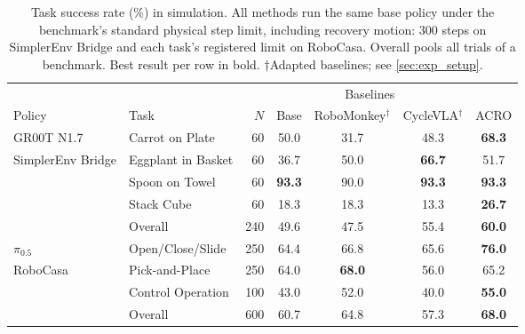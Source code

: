 \begin{table}[!t]
\centering
\small
\setlength{\tabcolsep}{6pt}
\caption{Task success rate (\%) in simulation. All methods run the same base policy under the benchmark's standard physical step limit, including recovery motion: 300 steps on SimplerEnv Bridge and each task's registered limit on RoboCasa. Overall pools all trials of a benchmark. Best result per row in bold. $\dagger$Adapted baselines; see \cref{sec:exp_setup}.}
\label{tab:main-results}
\begin{tabular}{@{}llrcccc@{}}
\toprule
 & & & \multicolumn{3}{c}{Baselines} & \\
\cmidrule(lr){4-6}
Policy & Task & $N$ & Base & RoboMonkey$^\dagger$ & CycleVLA$^\dagger$ & ACRO \\
\midrule
GR00T N1.7 & Carrot on Plate    & 60 & 50.0 & 31.7 & 48.3 & \textbf{68.3} \\
{\footnotesize SimplerEnv Bridge} & Eggplant in Basket & 60 & 36.7 & 50.0 & \textbf{66.7} & 51.7 \\
           & Spoon on Towel     & 60 & \textbf{93.3} & 90.0 & \textbf{93.3} & \textbf{93.3} \\
           & Stack Cube         & 60 & 18.3 & 18.3 & 13.3 & \textbf{26.7} \\
\cmidrule(l){2-7}
           & Overall            & 240 & 49.6 & 47.5 & 55.4 & \textbf{60.0} \\
\midrule
$\pi_{0.5}$ & Open/Close/Slide        & 250 & 64.4 & 66.8 & 65.6 & \textbf{76.0} \\
{\footnotesize RoboCasa} & Pick-and-Place & 250 & 64.0 & \textbf{68.0} & 56.0 & 65.2 \\
            & Control Operation       & 100 & 43.0 & 52.0 & 40.0 & \textbf{55.0} \\
\cmidrule(l){2-7}
            & Overall                 & 600 & 60.7 & 64.8 & 57.3 & \textbf{68.0} \\
\bottomrule
\end{tabular}
\end{table}
